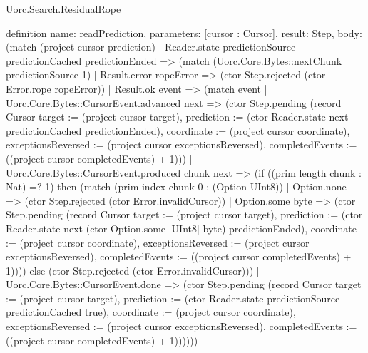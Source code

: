 \begin{lexlean}{Uorc.Search.ResidualRope}
\begin{semanticmodule}
definition{
  name: readPrediction,
  parameters: [cursor : Cursor],
  result: Step,
  body: (match (project cursor prediction)
    | Reader.state predictionSource predictionCached predictionEnded => (match (Uorc.Core.Bytes::nextChunk predictionSource 1)
      | Result.error ropeError => (ctor Step.rejected (ctor Error.rope ropeError))
      | Result.ok event => (match event
        | Uorc.Core.Bytes::CursorEvent.advanced next => (ctor Step.pending (record Cursor {target := (project cursor target), prediction := (ctor Reader.state next predictionCached predictionEnded), coordinate := (project cursor coordinate), exceptionsReversed := (project cursor exceptionsReversed), completedEvents := ((project cursor completedEvents) + 1)}))
        | Uorc.Core.Bytes::CursorEvent.produced chunk next => (if ((prim length chunk : Nat) =? 1) then (match (prim index chunk 0 : (Option UInt8))
          | Option.none => (ctor Step.rejected (ctor Error.invalidCursor))
          | Option.some byte => (ctor Step.pending (record Cursor {target := (project cursor target), prediction := (ctor Reader.state next (ctor Option.some [UInt8] byte) predictionEnded), coordinate := (project cursor coordinate), exceptionsReversed := (project cursor exceptionsReversed), completedEvents := ((project cursor completedEvents) + 1)}))) else (ctor Step.rejected (ctor Error.invalidCursor)))
        | Uorc.Core.Bytes::CursorEvent.done => (ctor Step.pending (record Cursor {target := (project cursor target), prediction := (ctor Reader.state predictionSource predictionCached true), coordinate := (project cursor coordinate), exceptionsReversed := (project cursor exceptionsReversed), completedEvents := ((project cursor completedEvents) + 1)})))))
}


\end{semanticmodule}
\end{lexlean}
